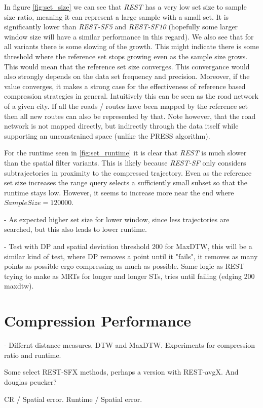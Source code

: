 In figure \ref{fig:set_size} we can see that \textit{REST} has a very low set size to sample size ratio, meaning it can represent a large sample with a small set. It is significantly lower than \textit{REST-SF5} and \textit{REST-SF10} (hopefully some larger window size will have a similar performance in this regard). We also see that for all variants there is some slowing of the growth. This might indicate there is some threshold where the reference set stops growing even as the sample size grows. This would mean that the reference set size converges. This convergance would also strongly depends on the data set frequency and precision. Moreover, if the value converges, it makes a strong case for the effectiveness of reference based compression strategies in general. Intuitively this can be seen as the road network of a given city. If all the roads / routes have been mapped by the reference set then all new routes can also be represented by that. Note however, that the road network is not mapped directly, but indirectly through the data itself while supporting an unconstrained space (unlike the PRESS algorithm).

For the runtime seen in \ref{fig:set_runtime} it is clear that \textit{REST} is much slower than the spatial filter variants. This is likely because \textit{REST-SF} only considers subtrajectories in proximity to the compressed trajectory. Even as the reference set size increases the range query selects a sufficiently small subset so that the runtime stays low. However, it seems to increase more near the end where $Sample Size = 120 000$.

- As expected higher set size for lower window, since less trajectories are searched, but this also leads to lower runtime.

- Test with DP and spatial deviation threshold 200 for MaxDTW, this will be a similar kind of test, where DP removes a point until it "fails", it removes as many points as possible ergo compressing as much as possible. Same logic as REST trying to make as MRTs for longer and longer STs, tries until failing (edging 200 maxdtw).

\section{Compression Performance}
- Differnt distance measures, DTW and MaxDTW. Experiments for compression ratio and runtime.

Some select REST-SFX methods, perhaps a version with REST-avgX. And douglas peucker?

CR / Spatial error. Runtime / Spatial error.